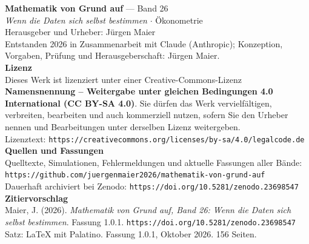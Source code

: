 \thispagestyle{empty}
\vspace*{\fill}
\begin{flushleft}
{\small\color{grau}
\textbf{\color{tief}Mathematik von Grund auf} --- Band 26\\[2pt]
\textit{Wenn die Daten sich selbst bestimmen} $\cdot$ Ökonometrie\\[14pt]

Herausgeber und Urheber: Jürgen Maier\\[2pt]
Entstanden 2026 in Zusammenarbeit mit Claude (Anthropic); Konzeption, Vorgaben, Prüfung und Herausgeberschaft: Jürgen Maier.\\[14pt]

\textbf{Lizenz}\\[2pt]
Dieses Werk ist lizenziert unter einer Creative-Commons-Lizenz \textbf{Namensnennung -- Weitergabe unter gleichen Bedingungen 4.0 International (CC BY-SA 4.0)}. Sie dürfen das Werk vervielfältigen, verbreiten, bearbeiten und auch kommerziell nutzen, sofern Sie den Urheber nennen und Bearbeitungen unter derselben Lizenz weitergeben.\\[2pt]
Lizenztext: \texttt{https://creativecommons.org/licenses/by-sa/4.0/legalcode.de}\\[14pt]

\textbf{Quellen und Fassungen}\\[2pt]
Quelltexte, Simulationen, Fehlermeldungen und aktuelle Fassungen aller Bände:\\
\texttt{https://github.com/juergenmaier2026/mathematik-von-grund-auf}\\[2pt]
Dauerhaft archiviert bei Zenodo: \texttt{https://doi.org/10.5281/zenodo.23698547}\\[14pt]

\textbf{Zitiervorschlag}\\[2pt]
Maier, J. (2026). \textit{Mathematik von Grund auf, Band 26: Wenn die Daten sich selbst bestimmen}. Fassung 1.0.1. \texttt{https://doi.org/10.5281/zenodo.23698547}\\[14pt]

Satz: \LaTeX{} mit Palatino. Fassung 1.0.1, Oktober 2026. 156 Seiten.
}
\end{flushleft}
\vspace*{1.5cm}
